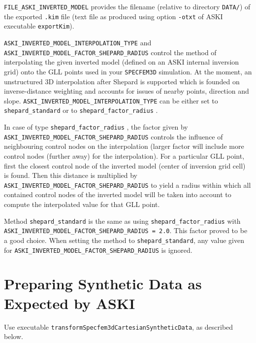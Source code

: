 \documentclass[12pt,a4paper]{article}
\newcommand{\lcode}[1]{\nolinkurl{#1}}
\newcommand{\ASKI}{ {\ttfamily ASKI} }
\begin{document}
\lcode{FILE_ASKI_INVERTED_MODEL} provides the filename (relative to directory \lcode{DATA/}) of the exported 
\lcode{.kim} file (text file as produced using option \lcode{-otxt} of \ASKI{} executable \lcode{exportKim}).

\lcode{ASKI_INVERTED_MODEL_INTERPOLATION_TYPE} and \lcode{ASKI_INVERTED_MODEL_FACTOR_SHEPARD_RADIUS}
control the method of interpolating the given inverted model (defined on an \ASKI{} internal inversion grid) 
onto the GLL points used in your \lcode{SPECFEM3D} simulation. At the moment, an unstructured 3D 
interpolation after Shepard \cite{Shepard68} is supported  which is founded on inverse-distance weighting 
and accounts for issues of nearby points, direction and slope. 
\lcode{ASKI_INVERTED_MODEL_INTERPOLATION_TYPE}
can be either set to \lcode{shepard_standard} or to \lcode{shepard_factor_radius} .

In case of type \lcode{shepard_factor_radius} , the factor given by \lcode{ASKI_INVERTED_MODEL_FACTOR_SHEPARD_RADIUS}
controls the influence of neighbouring control nodes on the interpolation (larger factor will include more 
control nodes (further away) for the interpolation). For a particular GLL point, first the closest control node of the inverted model
(center of inversion grid cell) is found. Then this distance is multiplied by 
\lcode{ASKI_INVERTED_MODEL_FACTOR_SHEPARD_RADIUS} to yield a radius within which all contained control nodes
of the inverted model will be taken into account to compute the interpolated value for that GLL point.

Method \lcode{shepard_standard} is the same as using \lcode{shepard_factor_radius} with \lcode{ASKI_INVERTED_MODEL_FACTOR_SHEPARD_RADIUS = 2.0}.
This factor proved to be a good choice. When setting the method to \lcode{shepard_standard}, any value given for 
\lcode{ASKI_INVERTED_MODEL_FACTOR_SHEPARD_RADIUS} is ignored.
%
\section{Preparing Synthetic Data as Expected by \ASKI{}}
%
Use executable \lcode{transformSpecfem3dCartesianSyntheticData}, as described below.
\end{document}
